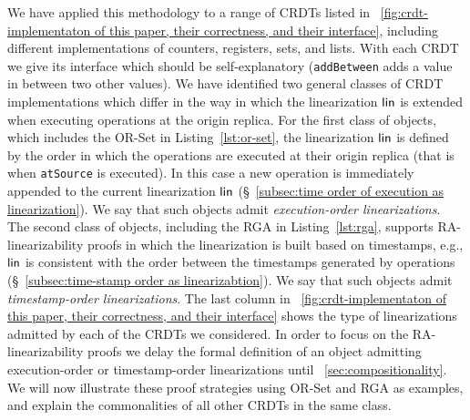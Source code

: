 We have applied this methodology to a range of CRDTs listed in \figureautorefname~\ref{fig:crdt-implementaton of this paper, their correctness, and their interface},
including different implementations of counters, registers, sets, and lists. With each CRDT we give its interface which should be self-explanatory
({\tt addBetween} adds a value in between two other values).
We have identified two general classes of
CRDT implementations which differ in the way in which the
linearization $\mathsf{lin}$ is extended when executing operations at
the origin replica.
For the first class of objects, which includes the OR-Set in
Listing~\ref{lst:or-set}, the linearization $\mathsf{lin}$ is defined by
the order in which the operations are executed at their origin replica (that is
when \lstinline|atSource| is executed).
In this case a new operation is immediately appended
to the current linearization $\mathsf{lin}$ (\S~\ref{subsec:time order of execution
  as linearization}).
We say that such objects admit \emph{execution-order linearizations}.
The second class of objects, including the RGA in
Listing~\ref{lst:rga}, supports RA-linearizability proofs in which the
linearization is built based on timestamps, e.g., $\mathsf{lin}$ is
consistent with the order between the timestamps generated by
operations (\S~\ref{subsec:time-stamp order as linearizabtion}).
We say that such objects admit \emph{timestamp-order linearizations}.
The last column in \figureautorefname~\ref{fig:crdt-implementaton of this paper, their correctness, and their interface}
shows the type of linearizations admitted by each of the CRDTs we considered. 
In order to focus on the RA-linearizability proofs we delay the formal definition 
of an object admitting execution-order or timestamp-order linearizations until \sectionautorefname~\ref{sec:compositionality}.
We will now illustrate these proof strategies using OR-Set and RGA as examples,
%
and explain the commonalities of all other CRDTs in
the same class.

